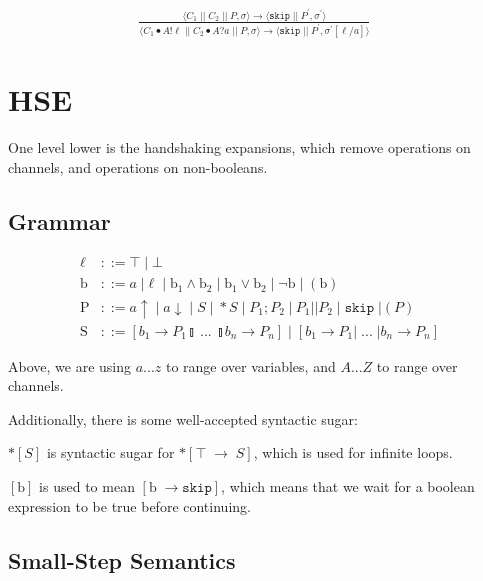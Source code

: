 \documentclass[times,10pt]{article}
\begin{document}
\begin{align*}
\frac{ \langle C_1 \; || \; C_2 \; || \; P, \sigma \rangle \rightarrow \langle \mathtt{skip} \; || \; P^\prime , \sigma^\prime \rangle }{ \langle C_1 \bullet A!\ell \; || \; C_2 \bullet A?a \; || \; P , \sigma \rangle \rightarrow \langle  \mathtt{skip} \; || \; P^\prime, \sigma^\prime[\ell/a] \rangle } & 
\end{align*}

\section{HSE}

One level lower is the handshaking expansions, which remove operations on channels, and operations on non-booleans.

\subsection{Grammar}

\begin{align*}
\ell & ::= \top \; | \perp \\
\mathrm{b} & ::= a \; | \ell \; | \; \mathrm{b}_1 \wedge \mathrm{b}_2 \; | \; \mathrm{b}_1 \vee \mathrm{b}_2 \; | \; \lnot \mathrm{b} \; | \; ( \mathrm{b} ) \\
\mathrm{P} & ::= a\uparrow \; | \; a\downarrow \; | \; S \; | \; *S \; | \; P_1; P_2 \; | \: P_1 || P_2 \; | \; \mathtt{skip} \; | ( P )  \\
\mathrm{S} & ::= [ b_1 \rightarrow P_1  \talloblong \; ... \; \talloblong b_n \rightarrow P_n ] \; | \; [ b_1 \rightarrow P_1 | \; ... \; | b_n \rightarrow P_n ]
\end{align*}

Above, we are using $a ... z$ to range over variables, and $A ... Z$ to range over channels.

Additionally, there is some well-accepted syntactic sugar:

$*[S]$ is syntactic sugar for $*[ \top \; \rightarrow \; S]$, which is used for infinite loops. 

$[\textrm{b}]$ is used to mean $[\textrm{b} \; \rightarrow \mathtt{skip}]$, which means that we wait for a boolean expression to be true before continuing.

\subsection{Small-Step Semantics}
\end{document}
